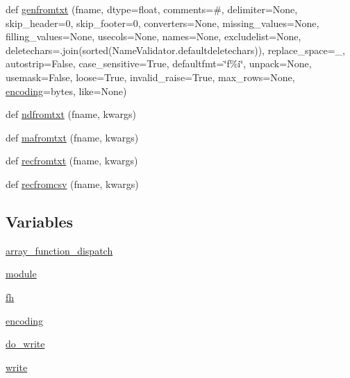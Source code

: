 \begin{DoxyCompactItemize}
\item 
def \hyperlink{namespacenumpy_1_1lib_1_1npyio_a02c1f00c4ea3d1d92c6ef862e15e0e38}{genfromtxt} (fname, dtype=float, comments=\textquotesingle{}\#\textquotesingle{}, delimiter=None, skip\+\_\+header=0, skip\+\_\+footer=0, converters=None, missing\+\_\+values=None, filling\+\_\+values=None, usecols=None, names=None, excludelist=None, deletechars=\textquotesingle{}\textquotesingle{}.join(sorted(Name\+Validator.\+defaultdeletechars)), replace\+\_\+space=\textquotesingle{}\+\_\+\textquotesingle{}, autostrip=False, case\+\_\+sensitive=True, defaultfmt=\char`\"{}f\%i\char`\"{}, unpack=None, usemask=False, loose=True, invalid\+\_\+raise=True, max\+\_\+rows=None, \hyperlink{namespacenumpy_1_1lib_1_1npyio_a24fe0d72d445b9775f02fe100396d2b7}{encoding}=\textquotesingle{}bytes\textquotesingle{}, like=None)
\item 
def \hyperlink{namespacenumpy_1_1lib_1_1npyio_af96203ee43401b14ba9a590915a918b6}{ndfromtxt} (fname, kwargs)
\item 
def \hyperlink{namespacenumpy_1_1lib_1_1npyio_af5a8046f569dd27959b807804e66982e}{mafromtxt} (fname, kwargs)
\item 
def \hyperlink{namespacenumpy_1_1lib_1_1npyio_aa31806efa16c668c2d70ae308515342d}{recfromtxt} (fname, kwargs)
\item 
def \hyperlink{namespacenumpy_1_1lib_1_1npyio_a6461d162ba9cde777930873522666cd9}{recfromcsv} (fname, kwargs)
\end{DoxyCompactItemize}
\subsection*{Variables}
\begin{DoxyCompactItemize}
\item 
\hyperlink{namespacenumpy_1_1lib_1_1npyio_a5174822613aa364cc4c0d25861c3fb3b}{array\+\_\+function\+\_\+dispatch}
\item 
\hyperlink{namespacenumpy_1_1lib_1_1npyio_a52df57a3fb19495bcd4c9e5b17568270}{module}
\item 
\hyperlink{namespacenumpy_1_1lib_1_1npyio_a4991d480ceeeb43e7c9258e78a31fb77}{fh}
\item 
\hyperlink{namespacenumpy_1_1lib_1_1npyio_a24fe0d72d445b9775f02fe100396d2b7}{encoding}
\item 
\hyperlink{namespacenumpy_1_1lib_1_1npyio_aa307ef1d7a07340aede9aac1f80265bd}{do\+\_\+write}
\item 
\hyperlink{namespacenumpy_1_1lib_1_1npyio_ac540394a5e912ec17785248cebb76e41}{write}
\end{DoxyCompactItemize}


